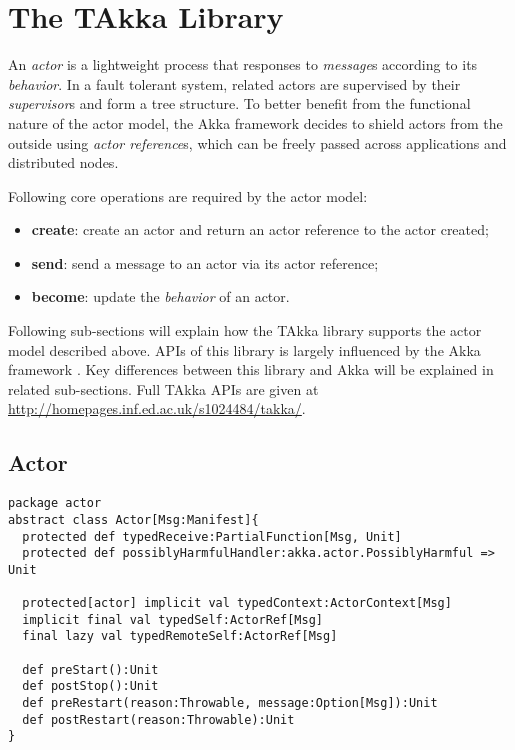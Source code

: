 \section{The TAkka Library}
\label{actor}

An \textit{actor} is a lightweight process that responses to \textit{message}s according to its \textit{behavior}.  In a fault tolerant system, related actors are supervised by their \textit{supervisor}s and form a tree structure.  To better benefit from the functional nature of the actor model, the Akka framework \cite{akka_doc, akka_api} decides to shield actors from the outside using \textit{actor reference}s, which can be freely passed across applications and distributed nodes.

Following core operations are required by the actor model:
\begin{itemize}
  \item \textbf{create}: create an actor and return an actor reference to the actor created;
  \item \textbf{send}: send a message to an actor via its actor reference;
  \item \textbf{become}: update the \textit{behavior} of an actor.
\end{itemize}

Following sub-sections will explain how the TAkka library supports the actor model described above.  APIs of this library is largely influenced by the Akka framework \cite{akka_api}.  Key differences between this library and Akka will be explained in related sub-sections.  Full TAkka APIs are given at \url{http://homepages.inf.ed.ac.uk/s1024484/takka/}.

\subsection{Actor}
\label{sec_actor}

\begin{lstlisting}
package actor
abstract class Actor[Msg:Manifest]{
  protected def typedReceive:PartialFunction[Msg, Unit]
  protected def possiblyHarmfulHandler:akka.actor.PossiblyHarmful => Unit

  protected[actor] implicit val typedContext:ActorContext[Msg]
  implicit final val typedSelf:ActorRef[Msg]
  final lazy val typedRemoteSelf:ActorRef[Msg]

  def preStart():Unit
  def postStop():Unit
  def preRestart(reason:Throwable, message:Option[Msg]):Unit
  def postRestart(reason:Throwable):Unit
}
\end{lstlisting}

